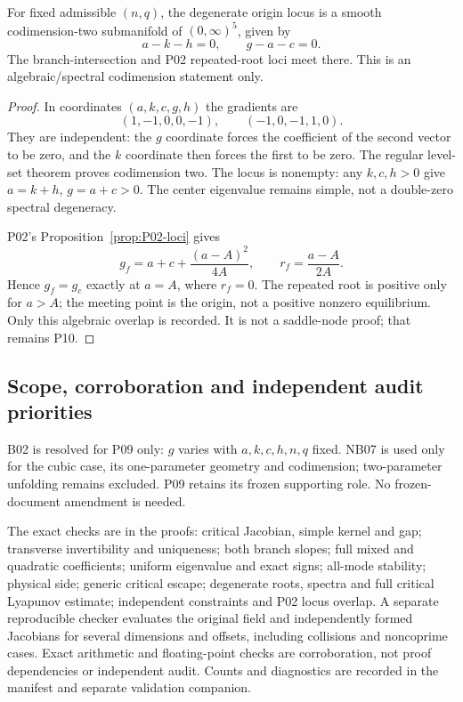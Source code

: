 \begin{proposition}
\label{prop:P09-codimension}
For fixed admissible $(n,q)$, the degenerate origin locus is a smooth
codimension-two submanifold of $(0,\infty)^5$, given by
\begin{equation}
 a-k-h=0,\qquad g-a-c=0.\label{eq:P09-degenerate-locus}
\end{equation}
The branch-intersection and P02 repeated-root loci meet there.
This is an algebraic/spectral codimension statement only.
\end{proposition}
\begin{proof}
In coordinates $(a,k,c,g,h)$ the gradients are
\[
 (1,-1,0,0,-1),\qquad(-1,0,-1,1,0).
\]
They are independent: the $g$ coordinate forces the coefficient of
the second vector to be zero, and the $k$ coordinate then forces the
first to be zero. The regular level-set theorem proves codimension two.
The locus is nonempty: any $k,c,h>0$ give $a=k+h$, $g=a+c>0$.
The center eigenvalue remains simple, not a double-zero spectral
 degeneracy.

P02's Proposition~\ref{prop:P02-loci} gives
\[
 g_f=a+c+\frac{(a-A)^2}{4A},\qquad r_f=\frac{a-A}{2A}.
\]
Hence $g_f=g_c$ exactly at $a=A$, where $r_f=0$.
The repeated root is positive only for $a>A$; the meeting point is
the origin, not a positive nonzero equilibrium. Only this algebraic
overlap is recorded. It is not a saddle-node proof; that remains P10.
\end{proof}

\subsection{Scope, corroboration and independent audit priorities}

B02 is resolved for P09 only: $g$ varies with $a,k,c,h,n,q$ fixed.
NB07 is used only for the cubic case, its one-parameter geometry and
codimension; two-parameter unfolding remains excluded. P09 retains its
frozen supporting role. No frozen-document amendment is needed.

The exact checks are in the proofs: critical Jacobian, simple kernel
and gap; transverse invertibility and uniqueness; both branch slopes;
full mixed and quadratic coefficients; uniform eigenvalue and exact
signs; all-mode stability; physical side; generic critical escape;
degenerate roots, spectra and full critical Lyapunov estimate;
independent constraints and P02 locus overlap. A separate reproducible
checker evaluates the original field and independently formed Jacobians
for several dimensions and offsets, including collisions and noncoprime
cases. Exact arithmetic and floating-point checks are corroboration,
not proof dependencies or independent audit. Counts and diagnostics
are recorded in the manifest and separate validation companion.

